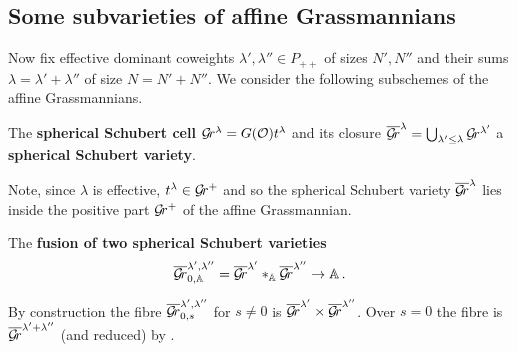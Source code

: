 \documentclass[draft]{article}
\begin{document}
\subsection{Some subvarieties of affine Grassmannians}
Now fix effective dominant coweights $\lambda', \lambda'' \in P_{++}$ of sizes $N',N''$  and their sums $ \lambda = \lambda' + \lambda'' $ of size $ N = N'+N''$. 
We consider the following subschemes of the affine Grassmannians.
% 
\begin{definition}
    The \textbf{spherical Schubert cell} $\mathcal{G}\!r^\lambda = G(\mathcal O) t^\lambda$ and its closure 
    $ \overline{\mathcal{G}\!r}^\lambda = \bigcup_{\lambda' \le \lambda} \mathcal{G}\!r^{\lambda'} $ a \textbf{spherical Schubert variety}.  
\end{definition}
    Note, since $ \lambda $ is effective, $ t^\lambda \in \mathcal{G}\!r^+ $ and so the spherical Schubert variety $\overline{\mathcal{G}\!r}^\lambda $ lies inside the positive part $ \mathcal{G}\!r^+$ of the affine Grassmannian. 
\begin{definition} 
    The \textbf{fusion of two spherical Schubert varieties} 
    $$ 
    \overline{\mathcal{G}\!r}^{\lambda', \lambda''}_{0, \mathbb A} = \overline{\mathcal{G}\!r}^{\lambda'} \ast_\mathbb A \overline{\mathcal{G}\!r}^{\lambda''} \rightarrow \mathbb A \,.
    $$
\end{definition}
    By construction the fibre $ \overline{\mathcal{G}\!r}_{0,s}^{\lambda', \lambda''} $ for $ s \ne 0 $ is $ \overline{\mathcal{G}\!r}^{\lambda'} \times \overline{\mathcal{G}\!r}^{\lambda''}$.  
    Over $s=0$ the fibre is $ \overline{\mathcal{G}\!r}^{\lambda' + \lambda''}$ (and reduced) by 
    \cite[Proposition 3.1.14]{zhu2016introduction}. 
\end{document}
